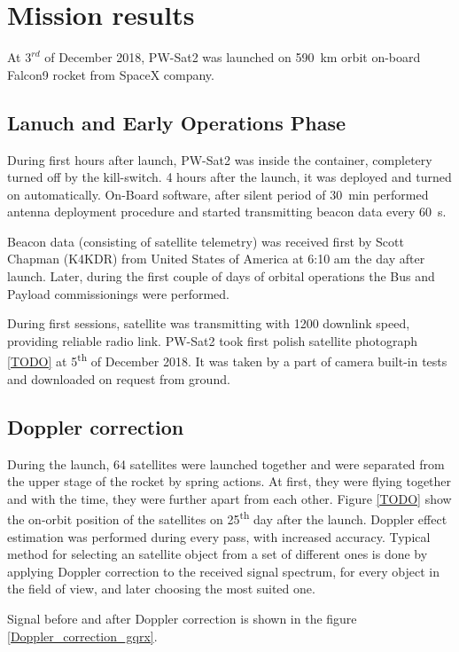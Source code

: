 \chapter{Mission results}
At $3^{rd}$ of December 2018, PW-Sat2 was launched on \SI{590}{\kilo\meter} orbit on-board Falcon9 rocket from SpaceX company. 

\section{Lanuch and Early Operations Phase}
During first hours after launch, PW-Sat2 was inside the container, completery turned off by the kill-switch. 4 hours after the launch, it was deployed and turned on automatically. On-Board software, after silent period of \SI{30}{\minute} performed antenna deployment procedure and started transmitting beacon data every \SI{60}{\second}.

Beacon data (consisting of satellite telemetry) was received first by Scott Chapman (K4KDR) from United States of America at 6:10 am the day after launch. Later, during the first couple of days of orbital operations the Bus and Payload commissionings were performed.

During first sessions, satellite was transmitting with \SI{1200}{\bps} downlink speed, providing reliable radio link. PW-Sat2 took first polish satellite photograph \ref{TODO} at \si{5^{th}} of December 2018. It was taken by a part of camera built-in tests and downloaded on request from ground.


\section{Doppler correction}
During the launch, \si{64} satellites were launched together and were separated from the upper stage of the rocket by spring actions. At first, they were flying together and with the time, they were further apart from each other. Figure \ref{TODO} show the on-orbit position of the satellites on \si{25^{th}} day after the launch. Doppler effect estimation was performed during every pass, with increased accuracy. Typical method for selecting an satellite object from a set of different ones is done by applying Doppler correction to the received signal spectrum, for every object in the field of view, and later choosing the most suited one. 

Signal before and after Doppler correction is shown in the figure \ref{Doppler_correction_gqrx}.

